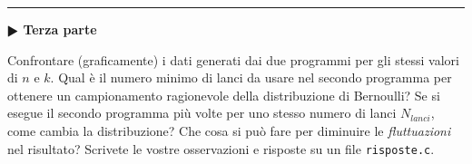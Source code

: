 \documentclass[11pt]{article}
\begin{document}
\hrule
\vspace{2mm}
\textbf{$\RHD$ Terza parte}
\vspace{2mm}

Confrontare (graficamente) i dati generati dai due programmi per gli stessi valori di $n$ e $k$.
Qual \`e il numero minimo di lanci da usare nel secondo programma per ottenere un campionamento ragionevole
della distribuzione di Bernoulli? Se si esegue il secondo programma pi\`u volte per uno stesso numero di lanci
$N_{lanci}$, come cambia la distribuzione? Che cosa si pu\`o fare per diminuire le {\em fluttuazioni} nel risultato?
Scrivete le vostre osservazioni e risposte su un file \texttt{risposte.c}.
\end{document}
